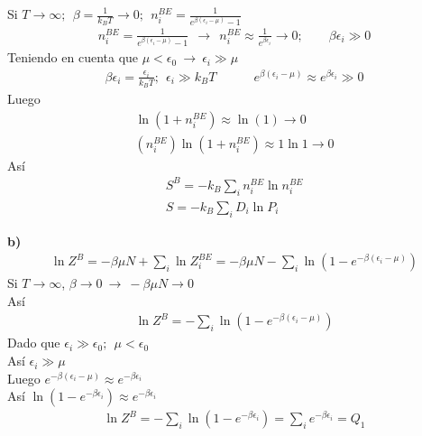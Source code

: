 \documentclass{article}
\begin{document}
Si $ T \rightarrow \infty; \ \ \beta = \frac{1}{k_B T } \rightarrow 0 ; \ \ n_i ^ {BE } = \frac{1}{e ^ {\beta(\epsilon_i - \mu)} - 1 } $
\begin{gather*}
  n_i ^ {BE } = \frac{1}{e ^ {\beta(\epsilon_i - \mu) } - 1 } \ \ \rightarrow \ \ n_i ^ {BE } \approx \frac{1}{e ^ {\beta\epsilon_i }} \rightarrow 0 ; \qquad \beta\epsilon_i \gg 0 
\end{gather*}
Teniendo en cuenta que $ \mu<\epsilon_0  \ \rightarrow \ \epsilon_i \gg \mu $ 
\begin{gather*}
  \beta\epsilon_i = \frac{\epsilon_i }{k_B T }; \ \ \epsilon_i \gg k_B T  \qquad \quad e ^ {\beta(\epsilon_i - \mu)} \approx e ^ {\beta\epsilon_i } \gg 0
\end{gather*}
Luego 
\begin{gather*}
  \ln(1 + n_i ^ {BE }) \approx \ln(1 ) \rightarrow 0 \\
  (n_i ^ {BE }) \ln (1 + n_i ^ {BE }) \approx 1 \ln 1 \rightarrow 0 
\end{gather*}
Así 
\begin{gather*}
  S^B = - k_B \displaystyle\sum_{i }^{} n_i ^ {BE }  \ln n_i ^ {BE }\\
  S = - k_B \displaystyle\sum_{i }^{} D_i \ln P_i 
\end{gather*}

\hfill 

\hfill

\textbf{b) } 
\begin{gather*}
  \ln Z^B = - \beta\mu N + \displaystyle\sum_{i }^{} \ln Z_i ^ {BE } = - \beta\mu N - \displaystyle\sum_{i }^{} \ln ( 1 - e ^ {- \beta(\epsilon_i - \mu)}) 
\end{gather*}
Si $ T \rightarrow  \infty $, $ \beta \rightarrow 0  \ \rightarrow \ - \beta\mu N \rightarrow 0 $\\
Así 
\begin{gather*}
  \ln Z^B = - \displaystyle\sum_{i }^{} \ln ( 1 - e ^ {- \beta(\epsilon_i - \mu)}) 
\end{gather*}
Dado que $ \epsilon_i \gg \epsilon_0 ; \ \ \mu<\epsilon_0  $\\
Así $ \epsilon_i \gg \mu  $\\
Luego $ e ^ {- \beta(\epsilon_i - \mu)} \approx e ^ {- \beta \epsilon_i } $ \\
Así $ \ln (1 - e ^ {- \beta\epsilon_i }) \approx e ^ {- \beta\epsilon_i } $
\begin{gather*}
  \ln Z^B = - \displaystyle\sum_{i }^{} \ln (1 - e ^ {-\beta \epsilon_i }) = \displaystyle\sum_{i }^{} e ^ {- \beta\epsilon_i } = Q_1  
\end{gather*}
\end{document}
